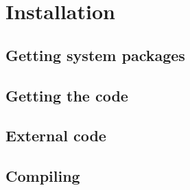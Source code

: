\section{Installation}

\subsection{Getting system packages}

\subsection{Getting the code}

\subsection{External code}

\subsection{Compiling}
